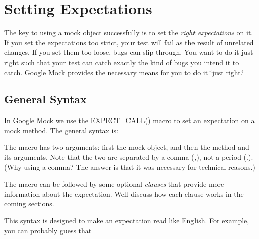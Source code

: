\section*{Setting Expectations}

The key to using a mock object successfully is to set the {\itshape right expectations} on it. If you set the expectations too strict, your test will fail as the result of unrelated changes. If you set them too loose, bugs can slip through. You want to do it just right such that your test can catch exactly the kind of bugs you intend it to catch. Google \mbox{\hyperlink{class_mock}{Mock}} provides the necessary means for you to do it \char`\"{}just right.\char`\"{}

\subsection*{General Syntax}

In Google \mbox{\hyperlink{class_mock}{Mock}} we use the {\ttfamily \mbox{\hyperlink{googletest-master_2googlemock_2include_2gmock_2gmock-spec-builders_8h_a535a6156de72c1a2e25a127e38ee5232}{E\+X\+P\+E\+C\+T\+\_\+\+C\+A\+L\+L()}}} macro to set an expectation on a mock method. The general syntax is\+:


\begin{DoxyCode}{0}
\end{DoxyCode}


The macro has two arguments\+: first the mock object, and then the method and its arguments. Note that the two are separated by a comma ({\ttfamily ,}), not a period ({\ttfamily .}). (Why using a comma? The answer is that it was necessary for technical reasons.)

The macro can be followed by some optional {\itshape clauses} that provide more information about the expectation. We\textquotesingle{}ll discuss how each clause works in the coming sections.

This syntax is designed to make an expectation read like English. For example, you can probably guess that



